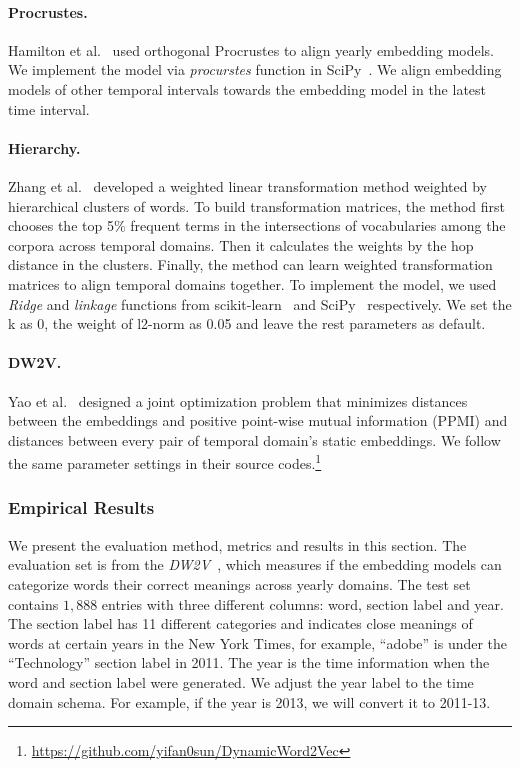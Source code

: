 \paragraph{Procrustes.} 
Hamilton et al.~\cite{hamilton2016diachronic} used orthogonal Procrustes to align yearly embedding models. We implement the model via \textit{procurstes} function in SciPy~\cite{scipy_2001}. We align embedding models of other temporal intervals towards the embedding model in the latest time interval.

\paragraph{Hierarchy.} 
Zhang et al.~\cite{zhang2017temporal} developed a weighted linear transformation method weighted by hierarchical clusters of words. To build transformation matrices, the method first chooses the top 5\% frequent terms in the intersections of vocabularies among the corpora across temporal domains. Then it calculates the weights by the hop distance in the clusters. Finally, the method can learn weighted transformation matrices to align temporal domains together. To implement the model, we used \textit{Ridge} and \textit{linkage} functions from scikit-learn~\cite{pedregosa2011scikit} and SciPy~\cite{scipy_2001} respectively. We set the k as 0, the weight of l2-norm as 0.05 and leave the rest parameters as default.

\paragraph{DW2V.} 
Yao et al.~\cite{yao2018dynamic} designed a joint optimization problem that minimizes distances between the embeddings and positive point-wise mutual information (PPMI) and distances between every pair of temporal domain's static embeddings. We follow the same parameter settings in their source codes.\footnote{\url{https://github.com/yifan0sun/DynamicWord2Vec}}

\subsubsection{Empirical Results}

We present the evaluation method, metrics and results in this section.
The evaluation set is from the \textit{DW2V}~\cite{yao2018dynamic}, which measures if the embedding models can categorize words their correct meanings across yearly domains. 
The test set contains $1,888$ entries with three different columns: word, section label and year.
The section label has 11 different categories and indicates close meanings of words at certain years in the New York Times, for example, ``adobe'' is under the ``Technology'' section label in 2011.
The year is the time information when the word and section label were generated.
We adjust the year label to the time domain schema.
For example, if the year is 2013, we will convert it to 2011-13.

